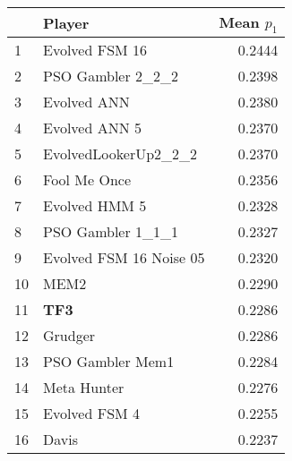 \begin{tabular}{llr}
\toprule
{} &                   Player &  Mean $p_1$ \\
\midrule
1  &           Evolved FSM 16 &      0.2444 \\
2  &        PSO Gambler 2\_2\_2 &      0.2398 \\
3  &              Evolved ANN &      0.2380 \\
4  &            Evolved ANN 5 &      0.2370 \\
5  &     EvolvedLookerUp2\_2\_2 &      0.2370 \\
6  &             Fool Me Once &      0.2356 \\
7  &            Evolved HMM 5 &      0.2328 \\
8  &        PSO Gambler 1\_1\_1 &      0.2327 \\
9  &  Evolved FSM 16 Noise 05 &      0.2320 \\
10 &                     MEM2 &      0.2290 \\
11 &                      \textbf{TF3} &      0.2286 \\
12 &                  Grudger &      0.2286 \\
13 &         PSO Gambler Mem1 &      0.2284 \\
14 &              Meta Hunter &      0.2276 \\
15 &            Evolved FSM 4 &      0.2255 \\
16 &                    Davis &      0.2237 \\
\bottomrule
\end{tabular}
